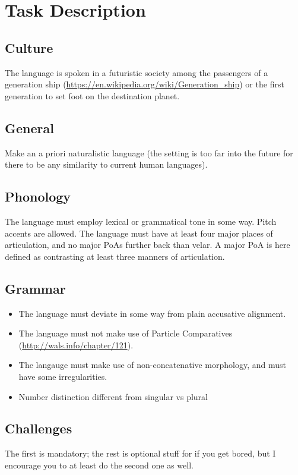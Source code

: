 \chapter{Task Description}

\section{Culture}
The language is spoken in a futuristic society among the passengers of a generation ship (\url{https://en.wikipedia.org/wiki/Generation_ship}) or the first generation to set foot on the destination planet.

\section{General}
Make an a priori naturalistic language (the setting is too far into the future for there to be any similarity to current human languages).

\section{Phonology}
The language must employ lexical or grammatical tone in some way. Pitch accents are allowed. 
The language must have at least four major places of articulation, and no major PoAs further back than velar. A major PoA is here defined as contrasting at least three manners of articulation.

\section{Grammar}

\begin{itemize}
    \item The language must deviate in some way from plain accusative alignment. 
    \item The language must not make use of Particle Comparatives (\url{http://wals.info/chapter/121}). 
    \item The langauge must make use of non-concatenative morphology, and must have some irregularities.
    \item Number distinction different from singular vs plural    
\end{itemize}

\section{Challenges}
The first is mandatory; the rest is optional stuff for if you get bored, but I encourage you to at least do the second one as well.

